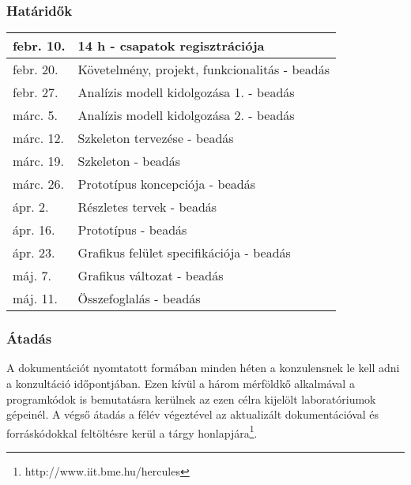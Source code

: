     \subsubsection{Határidők}
	\begin{center}
	\begin{tabular*}{0.65\textwidth}{@{\extracolsep{\fill}} | l | l | }
		\hline
		febr. 10. & 14 h - csapatok regisztrációja\\
		\hline
		febr. 20. & Követelmény, projekt, funkcionalitás - beadás\\
		\hline
		febr. 27. & Analízis modell kidolgozása 1. - beadás\\
		\hline
		márc. 5. & Analízis modell kidolgozása 2. - beadás\\
		\hline
		márc. 12. & Szkeleton tervezése - beadás\\
		\hline
		márc. 19. & Szkeleton - beadás\\
		\hline
		márc. 26. & Prototípus koncepciója - beadás\\
		\hline
		ápr. 2. & Részletes tervek - beadás\\
		\hline
		ápr. 16. & Prototípus - beadás\\
		\hline
		ápr. 23. & Grafikus felület specifikációja - beadás\\
		\hline
		máj. 7. & Grafikus változat - beadás\\
		\hline
		máj. 11. & Összefoglalás - beadás\\
		\hline
	\end{tabular*}
	\end{center}

    \subsubsection{Átadás}
	A dokumentációt nyomtatott formában minden héten a konzulensnek le kell adni a konzultáció időpontjában. Ezen kívül a három mérföldkő alkalmával a programkódok is bemutatásra kerülnek az ezen célra kijelölt laboratóriumok gépeinél. A végső átadás a félév végeztével az aktualizált dokumentációval és forráskódokkal feltöltésre kerül a tárgy honlapjára\footnote{http://www.iit.bme.hu/hercules}.

